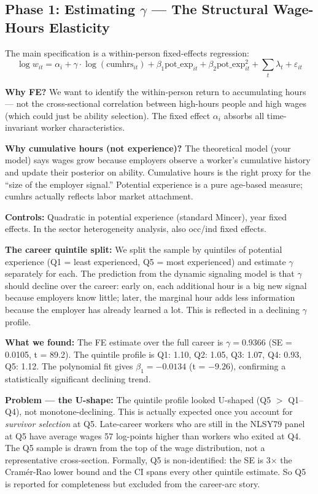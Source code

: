 \documentclass[11pt, letterpaper]{article}
\begin{document}
\subsection{Phase 1: Estimating $\gamma$ --- The Structural Wage-Hours Elasticity}

The main specification is a within-person fixed-effects regression:
$$\log w_{it} = \alpha_i + \gamma \cdot \log(\text{cumhrs}_{it}) + \beta_1 \text{pot\_exp}_{it} + \beta_2 \text{pot\_exp}^2_{it} + \sum_t \lambda_t + \varepsilon_{it}$$

\textbf{Why FE?} We want to identify the within-person return to accumulating hours --- not the cross-sectional correlation between high-hours people and high wages (which could just be ability selection). The fixed effect $\alpha_i$ absorbs all time-invariant worker characteristics.

\textbf{Why cumulative hours (not experience)?} The theoretical model (your model) says wages grow because employers observe a worker's cumulative history and update their posterior on ability. Cumulative hours is the right proxy for the ``size of the employer signal.'' Potential experience is a pure age-based measure; cumhrs actually reflects labor market attachment.

\textbf{Controls:} Quadratic in potential experience (standard Mincer), year fixed effects. In the sector heterogeneity analysis, also occ/ind fixed effects.

\textbf{The career quintile split:} We split the sample by quintiles of potential experience (Q1 = least experienced, Q5 = most experienced) and estimate $\gamma$ separately for each. The prediction from the dynamic signaling model is that $\gamma$ should decline over the career: early on, each additional hour is a big new signal because employers know little; later, the marginal hour adds less information because the employer has already learned a lot. This is reflected in a declining $\gamma$ profile.

\textbf{What we found:} The FE estimate over the full career is $\gamma = 0.9366$ (SE = 0.0105, t = 89.2). The quintile profile is Q1: 1.10, Q2: 1.05, Q3: 1.07, Q4: 0.93, Q5: 1.12. The polynomial fit gives $\beta_1 = -0.0134$ (t = $-9.26$), confirming a statistically significant declining trend.

\textbf{Problem --- the U-shape:} The quintile profile looked U-shaped (Q5 $> $ Q1--Q4), not monotone-declining. This is actually expected once you account for \textit{survivor selection} at Q5. Late-career workers who are still in the NLSY79 panel at Q5 have average wages 57 log-points higher than workers who exited at Q4. The Q5 sample is drawn from the top of the wage distribution, not a representative cross-section. Formally, Q5 is non-identified: the SE is 3$\times$ the Cramér-Rao lower bound and the CI spans every other quintile estimate. So Q5 is reported for completeness but excluded from the career-arc story.
\end{document}

